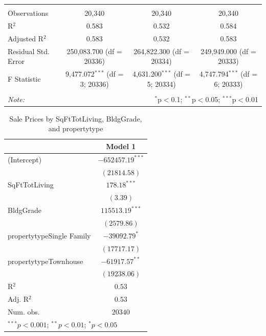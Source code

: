 \documentclass[12pt,a4paper]{article}
\begin{document}
\begin{table}[H]
\begin{adjustbox}{width=1\textwidth}
\begin{tabular}{@{\extracolsep{5pt}}lccc}
		\hline \\[-1.8ex] 
		Observations & 20,340 & 20,340 & 20,340 \\ 
		R$^{2}$ & 0.583 & 0.532 & 0.584 \\ 
		Adjusted R$^{2}$ & 0.583 & 0.532 & 0.583 \\ 
		Residual Std. Error & 250,083.700 (df = 20336) & 264,822.300 (df = 20334) & 249,949.000 (df = 20333) \\ 
		F Statistic & 9,477.072$^{***}$ (df = 3; 20336) & 4,631.200$^{***}$ (df = 5; 20334) & 4,747.794$^{***}$ (df = 6; 20333) \\ 
		\hline 
		\hline \\[-1.8ex] 
		\textit{Note:}  & \multicolumn{3}{r}{$^{*}$p$<$0.1; $^{**}$p$<$0.05; $^{***}$p$<$0.01} \\ 
	\end{tabular}
	\end{adjustbox}
\end{table} 

\begin{table}[H] \centering
	\caption{Sale Prices by SqFtTotLiving, BldgGrade, and propertytype} 
	\label{}
		\begin{tabular}{l c}
			\hline
			& Model 1 \\
			\hline
			(Intercept)               & $-652457.19^{***}$ \\
			& $(21814.58)$       \\
			SqFtTotLiving             & $178.18^{***}$     \\
			& $(3.39)$           \\
			BldgGrade                 & $115513.19^{***}$  \\
			& $(2579.86)$        \\
			propertytypeSingle Family & $-39092.79^{*}$    \\
			& $(17717.17)$       \\
			propertytypeTownhouse     & $-61917.57^{**}$   \\
			& $(19238.06)$       \\
			\hline
			R$^2$                     & $0.53$             \\
			Adj. R$^2$                & $0.53$             \\
			Num. obs.                 & $20340$            \\
			\hline
			\multicolumn{2}{l}{\scriptsize{$^{***}p<0.001$; $^{**}p<0.01$; $^{*}p<0.05$}}
		\end{tabular}
\end{table}
\end{document}

